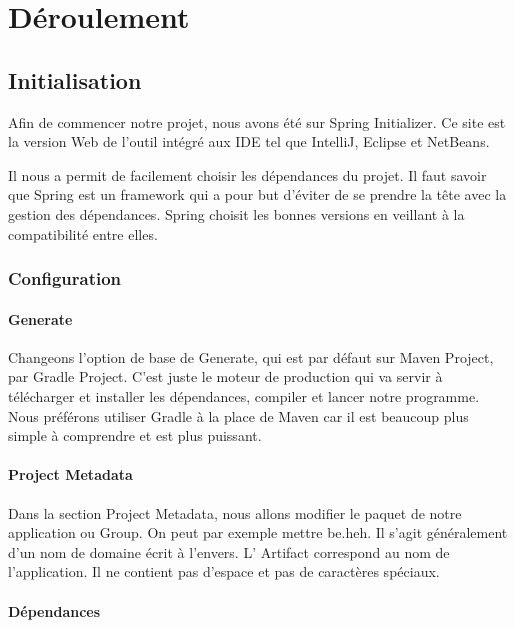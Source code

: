 \section{Déroulement}
\subsection{Initialisation}
Afin de commencer notre projet, nous avons été sur Spring Initializer. Ce site est la version Web de l'outil intégré aux IDE tel que IntelliJ, Eclipse et NetBeans.

Il nous a permit de facilement choisir les dépendances du projet. Il faut savoir que Spring est un framework qui a pour but d'éviter de se prendre la tête avec la gestion des dépendances. Spring choisit les bonnes versions en veillant à la compatibilité entre elles.

\subsubsection{Configuration}

\paragraph{Generate}

Changeons l'option de base de \og{}Generate\fg{}, qui est par défaut sur \og{}Maven Project\fg{}, par \og{}Gradle Project\fg{}. C'est juste le moteur de production qui va servir à télécharger et installer les dépendances, compiler et lancer notre programme. Nous préférons utiliser Gradle à la place de Maven car il est beaucoup plus simple à comprendre et est plus puissant.

\paragraph{Project Metadata}

Dans la section \og{}Project Metadata, nous allons modifier le paquet de notre application ou \og{}Group\fg{}. On peut par exemple mettre \og{}be.heh\fg{}. Il s'agit généralement d'un nom de domaine écrit à l'envers.
L' \og{}Artifact\fg{} correspond au nom de l'application. Il ne contient pas d'espace et pas de caractères spéciaux.

\paragraph{Dépendances}

